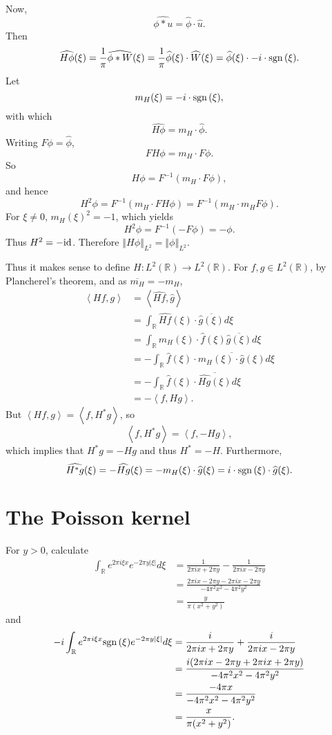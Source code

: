 \documentclass{article}
\newcommand{\inner}[2]{\left\langle #1, #2 \right\rangle}
\newcommand{\id}{\ensuremath\mathrm{id}}
\newcommand{\sgn}{\ensuremath\mathrm{sgn}\,}
\newcommand{\norm}[1]{\left\Vert #1 \right\Vert}
\theoremstyle{definition}
\begin{document}
Now,
\[
\widehat{\phi*u} = \widehat{\phi} \cdot \widehat{u}.
\]
Then
\[
\widehat{H\phi}(\xi) = \frac{1}{\pi} \widehat{\phi*W}(\xi) = \frac{1}{\pi} \widehat{\phi}(\xi) \cdot \widehat{W}(\xi)
=\widehat{\phi}(\xi) \cdot -i \cdot \sgn(\xi).
\]
Let
\[
m_H(\xi) = - i \cdot \sgn(\xi),
\]
with which
\[
\widehat{H\phi} = m_H \cdot \widehat{\phi}.
\]
Writing $F\phi = \widehat{\phi}$,
\[
FH \phi = m_H \cdot F\phi.
\]
So
\[
H \phi = F^{-1}(m_H \cdot F\phi),
\]
and hence
\[
H^2 \phi = F^{-1}(m_H \cdot F H\phi)
=F^{-1}(m_H \cdot m_H F\phi).
\]
For $\xi \neq 0$, $m_H(\xi)^2 = -1$, which yields
\[
H^2 \phi = F^{-1}(-F\phi) = -\phi.
\]
Thus $H^2 = -\id$.
Therefore $\norm{H\phi}_{L^2}=\norm{\phi}_{L^2}$.

Thus it makes sense to define $H:L^2(\mathbb{R}) \to L^2(\mathbb{R})$. 
For $f,g \in L^2(\mathbb{R})$, by Plancherel's theorem, and as $\overline{m_H}=-m_H$,
\begin{align*}
\inner{Hf}{g}&=\inner{\widehat{Hf}}{\widehat{g}}\\
&=\int_{\mathbb{R}} \widehat{Hf}(\xi) \cdot \overline{\widehat{g}(\xi)} d\xi\\
&=\int_{\mathbb{R}} m_H(\xi) \cdot \widehat{f}(\xi) \overline{\widehat{g}(\xi)} d\xi\\
&=-\int_{\mathbb{R}} \widehat{f}(\xi) \cdot \overline{m_H(\xi) \cdot \widehat{g}(\xi)} d\xi\\
&=-\int_{\mathbb{R}} \widehat{f}(\xi) \cdot \overline{\widehat{Hg}(\xi)} d\xi\\
&=-\inner{f}{Hg}.
\end{align*}
But $\inner{Hf}{g}=\inner{f}{H^*g}$, so
\[
\inner{f}{H^*g} = \inner{f}{-Hg},
\]
which implies that $H^*g=-Hg$ and thus $H^*=-H$. Furthermore,
\[
\widehat{H^*g}(\xi) = -\widehat{Hg}(\xi) = -m_H(\xi) \cdot \widehat{g}(\xi) = i \cdot \sgn(\xi) \cdot \widehat{g}(\xi).
\]





\section{The Poisson kernel}
For $y>0$,
calculate
\begin{align*}
\int_{\mathbb{R}}e^{2\pi i\xi x} e^{-2\pi y|\xi|} d\xi&=\frac{1}{2\pi ix+2\pi y} - \frac{1}{2\pi ix-2\pi y}\\
&=\frac{2\pi ix-2\pi y-2\pi ix-2\pi y}{-4\pi^2 x^2 - 4\pi^2 y^2}\\
&=\frac{y}{\pi(x^2+y^2)}
\end{align*}
and
\begin{align*}
-i\int_{\mathbb{R}} e^{2\pi i\xi x} \sgn(\xi) e^{-2\pi y|\xi|} d\xi&=\frac{i}{2\pi ix+2\pi y}
+\frac{i}{2\pi ix-2\pi y}\\
&=\frac{i(2\pi ix-2\pi y+2\pi ix+2\pi y)}{-4\pi^2 x^2 -4\pi^2 y^2}\\
&=\frac{-4\pi x}{-4\pi^2 x^2-4\pi^2 y^2}\\
&=\frac{x}{\pi(x^2+y^2)}.
\end{align*}
\end{document}
